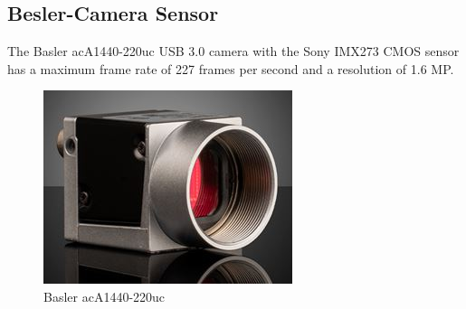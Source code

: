 \documentclass[11pt, a4paper, openany]{book}
\begin{document}
\subsection{Besler-Camera Sensor}
The Basler acA1440-220uc USB 3.0 camera with the Sony IMX273 CMOS sensor has a maximum frame rate of 227 frames per second and a resolution of 1.6 MP.\cite{maghami2021automated}
\begin{figure}[H]
    \centering
    \includegraphics[scale=0.5]{Labbot&ele/3.jpg}
    \caption{Basler acA1440-220uc}
    \label{fig:Camera}
\end{figure}\
\end{document}
